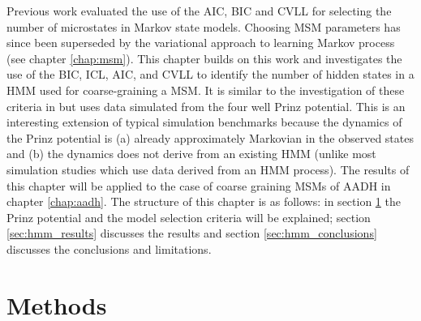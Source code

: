 Previous work \cite{mcgibbonStatisticalModelSelection2014a} evaluated the use of the AIC, BIC and CVLL for selecting the number of microstates in Markov state models. Choosing MSM parameters has since been superseded by the variational approach to learning Markov process (see chapter \ref{chap:msm}). This chapter builds on this work and investigates the use of the BIC, ICL, AIC, and CVLL to identify the number of hidden states in a HMM used for coarse-graining a MSM. It is similar to the investigation of these criteria in \cite{celeuxSelectingHiddenMarkov2008} but uses data simulated from the four well Prinz potential. This is an interesting extension of typical simulation benchmarks because the dynamics of the Prinz potential is (a) already approximately Markovian in the observed states and (b) the dynamics does not derive from an existing HMM (unlike most simulation studies which use data derived from an HMM process). The results of this chapter will be applied to the case of coarse graining MSMs of AADH in chapter \ref{chap:aadh}.  The structure of this chapter is as follows: in section \ref{sec:hmm_methods} the Prinz potential and the model selection criteria will be explained; section \ref{sec:hmm_results} discusses the results and section \ref{sec:hmm_conclusions} discusses the conclusions and limitations.

\section{Methods} \label{sec:hmm_methods}
